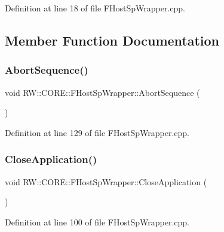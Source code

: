 Definition at line 18 of file F\+Host\+Sp\+Wrapper.\+cpp.



\subsection{Member Function Documentation}
\hypertarget{class_r_w_1_1_c_o_r_e_1_1_f_host_sp_wrapper_ad95d9017361d78c466afaf3c2bd391ee}{}\label{class_r_w_1_1_c_o_r_e_1_1_f_host_sp_wrapper_ad95d9017361d78c466afaf3c2bd391ee} 
\subsubsection{\texorpdfstring{Abort\+Sequence()}{AbortSequence()}}
{\footnotesize\ttfamily void R\+W\+::\+C\+O\+R\+E\+::\+F\+Host\+Sp\+Wrapper\+::\+Abort\+Sequence (\begin{DoxyParamCaption}{ }\end{DoxyParamCaption})}



Definition at line 129 of file F\+Host\+Sp\+Wrapper.\+cpp.

\hypertarget{class_r_w_1_1_c_o_r_e_1_1_f_host_sp_wrapper_a00ff512e1699742a7908540c11be1e40}{}\label{class_r_w_1_1_c_o_r_e_1_1_f_host_sp_wrapper_a00ff512e1699742a7908540c11be1e40} 
\subsubsection{\texorpdfstring{Close\+Application()}{CloseApplication()}}
{\footnotesize\ttfamily void R\+W\+::\+C\+O\+R\+E\+::\+F\+Host\+Sp\+Wrapper\+::\+Close\+Application (\begin{DoxyParamCaption}{ }\end{DoxyParamCaption})}



Definition at line 100 of file F\+Host\+Sp\+Wrapper.\+cpp.

\hypertarget{class_r_w_1_1_c_o_r_e_1_1_f_host_sp_wrapper_abfbe1c65f2383e10da83dfd1ab5825f0}{}\label{class_r_w_1_1_c_o_r_e_1_1_f_host_sp_wrapper_abfbe1c65f2383e10da83dfd1ab5825f0} 
